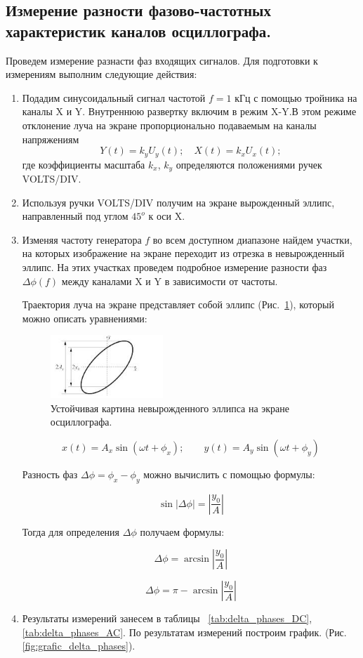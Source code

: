 \documentclass[12pt,a4paper]{article}
\begin{document}
	\subsection{Измерение разности фазово-частотных характеристик каналов осциллографа.}
		
	Проведем измерение разнасти фаз входящих сигналов. Для подготовки к измерениям выполним следующие действия:
	\begin{enumerate}
		\item Подадим синусоидальный сигнал частотой $f = 1$ кГц с помощью тройника на каналы X и Y. Внутреннюю развертку включим в режим X-Y.В этом режиме отклонение луча на экране пропорционально  подаваемым на каналы напряжениям $$Y(t) = k_{y}U_{y}(t);  \quad X(t) = k_{x}U_{x}(t);$$ где коэффициенты
масштаба $k_{x}$, $k_{y}$ определяются положениями ручек VOLTS/DIV.
		\item Используя ручки VOLTS/DIV получим на экране вырожденный эллипс, направленный под углом $45^{o}$ к оси X.
		\item Изменяя частоту генератора $ f $ во всем доступном диапазоне найдем участки, на которых изображение на экране переходит из отрезка в невырожденный эллипс. На этих участках проведем подробное измерение разности фаз $\Delta\phi(f)$ между каналами X и Y в зависимости от частоты.
		
		Траектория луча на экране представляет собой эллипс (Рис.~\ref{fig:ellipse}), который можно описать уравнениями:
		
	\begin{figure}[h]
		\begin{center}
			\includegraphics[width = 0.4\textwidth]{Ellipse_for_delta_phases}
			\caption{Устойчивая картина невырожденного эллипса на экране осциллографа.}
			\label{fig:ellipse}		
		\end{center}
	\end{figure}
		
	$$ x(t) = A_{x}\sin(\omega t + \phi_{x}); \qquad y(t) = A_{y}\sin(\omega t + \phi_{y}) $$
	
	Разность фаз $ \Delta\phi = \phi_{x} - \phi_{y} $ можно вычислить с помощью формулы:
	
	$$ \sin|\Delta\phi| = \left|\frac{y_{0}}{A}\right| $$
	
	Тогда для определения $\Delta\phi$  получаем формулы:
		
	$$\Delta\phi = \arcsin\left|\frac{y_{0}}{A}\right|$$		
				
	$$\Delta\phi = \pi - \arcsin\left|\frac{y_{0}}{A}\right|$$
		
		
	
	
		\item Результаты измерений занесем в таблицы ~\ref{tab:delta_phases_DC}, \ref{tab:delta_phases_AC}. По результатам измерений построим график. (Рис. \ref{fig:grafic_delta_phases}).
	\end{enumerate}
	
\end{document}
